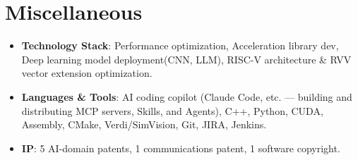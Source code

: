 \documentclass{resume}
\begin{document}
\section{Miscellaneous}

\begin{itemize}
  \item \textbf{Technology Stack}: Performance optimization, Acceleration library dev, Deep learning model deployment(CNN, LLM), RISC-V architecture \& RVV vector extension optimization.
  \item \textbf{Languages \& Tools}: AI coding copilot (Claude Code, etc. — building and distributing MCP servers, Skills, and Agents), C++, Python, CUDA, Assembly, CMake, Verdi/SimVision, Git, JIRA, Jenkins.
  \item \textbf{IP}: 5 AI-domain patents, 1 communications patent, 1 software copyright.
\end{itemize}
\end{document}
